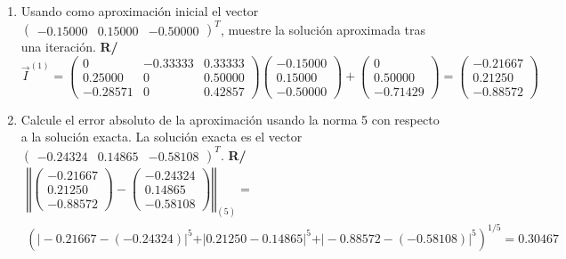 \documentclass[12pt]{article}
\begin{document}
\begin{enumerate}[leftmargin=*,widest=9]
{\begin{enumerate}[label=\alph*]
   \begin{eqnarray*}
   \vert 3 \vert > \vert 1 \vert + \vert -3 \vert \\
   \vert -4 \vert > \vert 1 \vert + \vert 2 \vert \\
   \vert -7 \vert > \vert -2 \vert + \vert 3 \vert
   \end{eqnarray*}
   Al cumplir esta condición, la matriz de coeficientes es una matriz estrictamente diagonal dominante, y por ende los métodos de Jacobi y de Gauss-Seidel serán convergentes a la solución única.
   \item Usando como aproximación inicial el vector \( \begin{pmatrix} -0.15000 & 0.15000 & -0.50000 \end{pmatrix}^T \), muestre la solución aproximada tras una iteración.
   \textbf{R/}
   \[
\vec{I}^{(1)} = \begin{pmatrix}0 & -0.33333 & 0.33333\\ 0.25000 & 0 & 0.50000\\ -0.28571 & 0 &  0.42857 \end{pmatrix}\begin{pmatrix} -0.15000\\ 0.15000\\ -0.50000 \end{pmatrix} + \begin{pmatrix} 0\\ 0.50000 \\ -0.71429 \end{pmatrix} = \begin{pmatrix}-0.21667\\0.21250\\-0.88572\end{pmatrix}
   \]
   \item Calcule el error absoluto de la aproximación usando la norma 5 con respecto a la solución exacta. La solución exacta es el vector
   \( \begin{pmatrix} -0.24324 & 0.14865 & -0.58108 \end{pmatrix}^T \).
   \textbf{R/}
   \begin{eqnarray*}
\left\Vert \begin{pmatrix}-0.21667\\0.21250\\-0.88572\end{pmatrix} - \begin{pmatrix} -0.24324 \\ 0.14865 \\ -0.58108 \end{pmatrix} \right\Vert_{(5)}= \\{\left(\vert -0.21667 - (-0.24324) \vert^5 + \vert 0.21250 - 0.14865 \vert^5 + \vert -0.88572 - (-0.58108) \vert^5\right)}^{1/5} = 0.30467
   \end{eqnarray*}
\end{enumerate}
}
   \end{enumerate}
\end{document}
